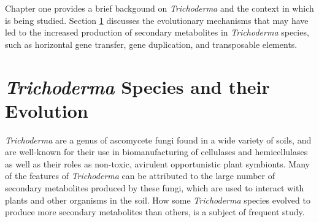
Chapter one provides a brief backgound on \textit{Trichoderma} and the context in which is being studied. Section \ref{lit:evolution} discusses the evolutionary mechanisms that may have led to the increased production of secondary metabolites in \textit{Trichoderma} species, such as horizontal gene transfer, gene duplication, and transposable elements. 

\section{\textit{Trichoderma} Species and their Evolution}
\label{lit:evolution}

\textit{Trichoderma} are a genus of ascomycete fungi found in a wide
variety of soils, and are well-known for their use in biomanufacturing
of cellulases and hemicellulases as well as their roles as non-toxic,
avirulent opportunistic plant symbionts\cite{Woo2023}\cite{Kubicek2019}. 
Many of the features of \textit{Trichoderma}
can be attributed to the large number of secondary metabolites
produced by these fungi, which are used to interact with plants and other organisms in the soil\cite{Mukherjee2012}. How some \textit{Trichoderma} species evolved to produce more secondary metabolites than others, is a subject of frequent study. 

